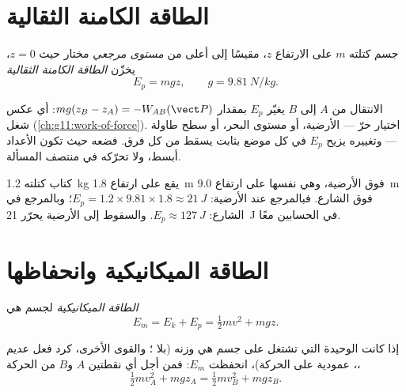 \section{الطاقة الكامنة الثقالية}

\begin{definition}\label{def:g11:mechanical-energy:potential}
جسم كتلته $m$ على الارتفاع $z$، مقيسًا إلى أعلى من
\emph{مستوى مرجعي} مختار حيث $z = 0$، يخزّن
\emph{الطاقة الكامنة الثقالية}
\[
E_p = m g z, \qquad g = \qty{9.81}{N/kg}.
\]
\end{definition}

\begin{remark}\label{rem:g11:mechanical-energy:reference}
الانتقال من $A$ إلى $B$ يغيّر $E_p$ بمقدار $mg(z_B - z_A) =
-W_{AB}(\vect P)$: أي عكس شغل 
(\cref{ch:g11:work-of-force}).  اختيار حرّ ---
الأرضية، أو مستوى البحر، أو سطح طاولة --- وتغييره يزيح $E_p$ في كل موضع بثابت
يسقط من كل فرق. فضعه حيث تكون الأعداد
أبسط، ولا تحرّكه في منتصف المسألة.
\end{remark}

\begin{example}\label{ex:g11:mechanical-energy:shelf}
كتاب كتلته \qty{1.2}{kg} يقع على ارتفاع \qty{1.8}{m} فوق الأرضية، وهي نفسها
على ارتفاع \qty{9.0}{m} فوق الشارع. فبالمرجع عند الأرضية:
$E_p = 1.2 \times 9.81 \times 1.8 \approx \qty{21}{J}$؛ وبالمرجع في الشارع:
$E_p \approx \qty{127}{J}$. والسقوط إلى الأرضية يحرّر \qty{21}{J} في
الحسابين معًا.
\end{example}

\section{الطاقة الميكانيكية وانحفاظها}

\begin{definition}\label{def:g11:mechanical-energy:em}
\emph{الطاقة الميكانيكية} لجسم هي
\[
E_m = E_k + E_p = \tfrac12 m v^2 + m g z .
\]
\end{definition}

\begin{theorem}\label{thm:g11:mechanical-energy:conservation}
إذا كانت  الوحيدة التي تشتغل على جسم هي وزنه (بلا ؛ والقوى
الأخرى، كرد فعل  عديم ، عمودية على
الحركة)، انحفظت $E_m$: فمن أجل أي نقطتين $A$ و$B$ من الحركة،
\[
\tfrac12 m v_A^2 + m g z_A = \tfrac12 m v_B^2 + m g z_B .
\]
\end{theorem}

